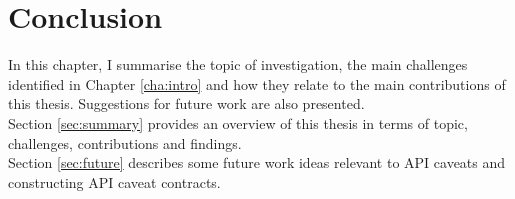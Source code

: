 \chapter{Conclusion}
\label{cha:conc}
In this chapter, I summarise the topic of investigation, the main challenges identified in Chapter \ref{cha:intro} and how they relate to the main contributions of this thesis. Suggestions for future work are also presented. \\

Section \ref{sec:summary} provides an overview of this thesis in terms of topic, challenges, contributions and findings.\\

Section \ref{sec:future} describes some future work ideas relevant to API caveats and constructing API caveat contracts.\\ 

